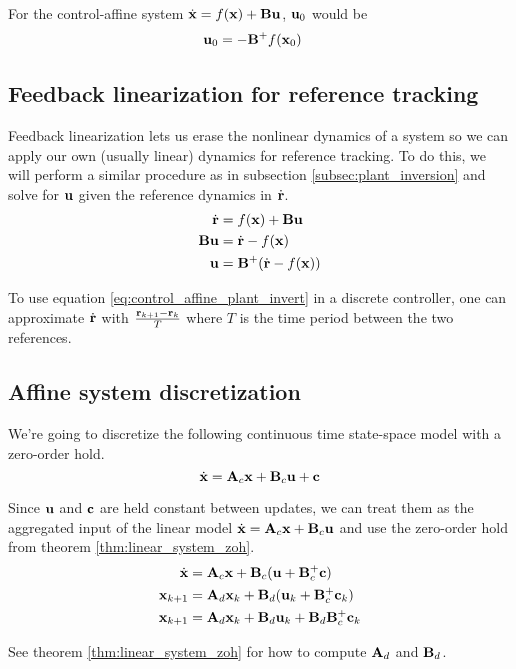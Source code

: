 For the control-affine \gls{system}
$\dot{\mathbf{x}} = f(\mathbf{x}) + \mathbf{B}\mathbf{u}$, $\mathbf{u}_0$ would be
\begin{align}
  \mathbf{u}_0 &= -\mathbf{B}^+ f(\mathbf{x}_0)
\end{align}

\subsection{Feedback linearization for reference tracking}

Feedback linearization lets us erase the nonlinear dynamics of a system so we
can apply our own (usually linear) dynamics for \gls{reference} tracking. To do
this, we will perform a similar procedure as in subsection
\ref{subsec:plant_inversion} and solve for $\mathbf{u}$ given the \gls{reference}
dynamics in $\dot{\mathbf{r}}$.
\begin{align}
  \dot{\mathbf{r}} &= f(\mathbf{x}) + \mathbf{B}\mathbf{u} \nonumber \\
  \mathbf{B}\mathbf{u} &= \dot{\mathbf{r}} - f(\mathbf{x}) \nonumber \\
  \mathbf{u} &= \mathbf{B}^+ (\dot{\mathbf{r}} - f(\mathbf{x}))
    \label{eq:control_affine_plant_invert}
\end{align}
\begin{remark}
  To use equation \eqref{eq:control_affine_plant_invert} in a discrete
  controller, one can approximate $\dot{\mathbf{r}}$ with
  $\frac{\mathbf{r}_{k + 1} - \mathbf{r}_k}{T}$ where $T$ is the time period between
  the two \glspl{reference}.
\end{remark}

\subsection{Affine system discretization}

We're going to discretize the following continuous time state-space model with a
zero-order hold.
\begin{equation*}
  \dot{\mathbf{x}} = \mathbf{A}_c\mathbf{x} + \mathbf{B}_c\mathbf{u} + \mathbf{c}
\end{equation*}

Since $\mathbf{u}$ and $\mathbf{c}$ are held constant between updates, we can treat
them as the aggregated input of the linear model
$\dot{\mathbf{x}} = \mathbf{A}_c\mathbf{x} + \mathbf{B}_c\mathbf{u}$ and use the zero-order
hold from theorem \ref{thm:linear_system_zoh}.
\begin{align}
  \dot{\mathbf{x}} &= \mathbf{A}_c\mathbf{x} + \mathbf{B}_c(\mathbf{u} + \mathbf{B}_c^+\mathbf{c})
    \nonumber \\
  \mathbf{x}_{k+1} &= \mathbf{A}_d \mathbf{x}_k + \mathbf{B}_d
    (\mathbf{u}_k + \mathbf{B}_c^+\mathbf{c}_k) \nonumber \\
  \mathbf{x}_{k+1} &= \mathbf{A}_d \mathbf{x}_k + \mathbf{B}_d \mathbf{u}_k +
    \mathbf{B}_d \mathbf{B}_c^+\mathbf{c}_k
\end{align}

See theorem \ref{thm:linear_system_zoh} for how to compute $\mathbf{A}_d$ and
$\mathbf{B}_d$.
